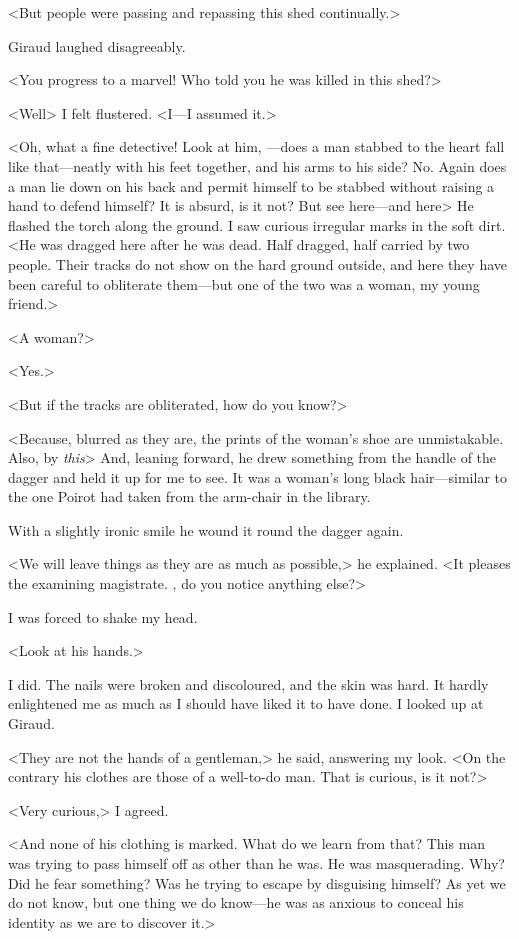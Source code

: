  <But people were passing and repassing this shed continually.> 

 Giraud laughed disagreeably. 

 <You progress to a marvel! Who told you he was killed in this shed?> 

 <Well\longdash> I felt flustered. <I—I assumed it.> 

 <Oh, what a fine detective! Look at him, —does a man stabbed to the heart fall like that—neatly with his feet together, and his arms to his side? No. Again does a man lie down on his back and permit himself to be stabbed without raising a hand to defend himself? It is absurd, is it not? But see here—and here\longdash> He flashed the torch along the ground. I saw curious irregular marks in the soft dirt. <He was dragged here after he was dead. Half dragged, half carried by two people. Their tracks do not show on the hard ground outside, and here they have been careful to obliterate them—but one of the two was a woman, my young friend.> 

 <A woman?> 

 <Yes.> 

 <But if the tracks are obliterated, how do you know?> 

 <Because, blurred as they are, the prints of the woman's shoe are unmistakable. Also, by \emph{this}\longdash> And, leaning forward, he drew something from the handle of the dagger and held it up for me to see. It was a woman's long black hair—similar to the one Poirot had taken from the arm-chair in the library. 

 With a slightly ironic smile he wound it round the dagger again. 

 <We will leave things as they are as much as possible,> he explained. <It pleases the examining magistrate. , do you notice anything else?> 

 I was forced to shake my head. 

 <Look at his hands.> 

 I did. The nails were broken and discoloured, and the skin was hard. It hardly enlightened me as much as I should have liked it to have done. I looked up at Giraud. 

 <They are not the hands of a gentleman,> he said, answering my look. <On the contrary his clothes are those of a well-to-do man. That is curious, is it not?> 

 <Very curious,> I agreed. 

 <And none of his clothing is marked. What do we learn from that? This man was trying to pass himself off as other than he was. He was masquerading. Why? Did he fear something? Was he trying to escape by disguising himself? As yet we do not know, but one thing we do know—he was as anxious to conceal his identity as we are to discover it.> 

